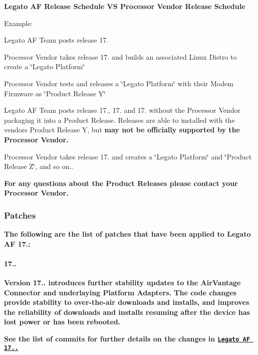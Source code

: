 {\bfseries  Legato AF Release Schedule VS Processor Vendor Release Schedule }



Example\+:
\begin{DoxyItemize}
\item Legato AF Team posts release 17.
\item Processor Vendor takes release 17. and builds an associated Linux Distro to create a \char`\"{}\+Legato
   Platform\char`\"{}
\item Processor Vendor tests and releases a \char`\"{}\+Legato Platform\char`\"{} with their Modem Firmware as \char`\"{}\+Product
   Release Y\char`\"{}
\item Legato AF Team posts release 17., 17. and 17. without the Processor Vendor packaging it into a Product Release. Releases are able to installed with the vendor\textquotesingle{}s Product Release Y, but {\bfseries  may not be officially supported by the Processor Vendor. }
\item Processor Vendor takes release 17. and creates a \char`\"{}\+Legato Platform\char`\"{} and \char`\"{}\+Product Release Z\char`\"{}, and so on..
\end{DoxyItemize}

{\bfseries For any questions about the Product Releases please contact your Processor Vendor.}

{\bfseries }\hypertarget{releaseNotes17081_rn1708_Patches}{}\subsubsection{Patches}\label{releaseNotes17081_rn1708_Patches}
{\bfseries  The following are the list of patches that have been applied to Legato AF 17.\+:}

{\bfseries }\hypertarget{releaseNotes17081_rn1708_Patches_17081}{}\paragraph{17..}\label{releaseNotes17081_rn1708_Patches_17081}
{\bfseries  Version 17.. introduces further stability updates to the Air\+Vantage Connector and underlaying Platform Adapters. The code changes provide stability to over-\/the-\/air downloads and installs, and improves the reliability of downloads and installs resuming after the device has lost power or has been rebooted.}

{\bfseries See the list of commits for further details on the changes in \href{https://github.com/legatoproject/legato-af/commits/17.08.1}{\tt Legato AF 17..}}

